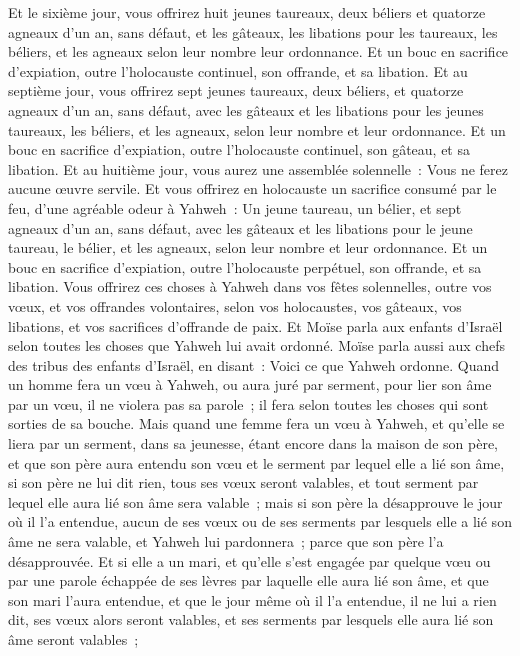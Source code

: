 \begin{multicols}{2}
Et le sixième jour, vous offrirez huit jeunes taureaux, deux béliers et quatorze agneaux d'un an, sans défaut,
et les gâteaux, les libations pour les taureaux, les béliers, et les agneaux selon leur nombre leur ordonnance.
Et un bouc en sacrifice d'expiation, outre l'holocauste continuel, son offrande, et sa libation.
Et au septième jour, vous offrirez sept jeunes taureaux, deux béliers, et quatorze agneaux d'un an, sans défaut,
avec les gâteaux et les libations pour les jeunes taureaux, les béliers, et les agneaux, selon leur nombre et leur ordonnance.
Et un bouc en sacrifice d'expiation, outre l'holocauste continuel, son gâteau, et sa libation.
Et au huitième jour, vous aurez une assemblée solennelle~: Vous ne ferez aucune œuvre servile.
Et vous offrirez en holocauste un sacrifice consumé par le feu, d'une agréable odeur à Yahweh~: Un jeune taureau, un bélier, et sept agneaux d'un an, sans défaut,
avec les gâteaux et les libations pour le jeune taureau, le bélier, et les agneaux, selon leur nombre et leur ordonnance.
Et un bouc en sacrifice d'expiation, outre l'holocauste perpétuel, son offrande, et sa libation.
Vous offrirez ces choses à Yahweh dans vos fêtes solennelles, outre vos vœux, et vos offrandes volontaires, selon vos holocaustes, vos gâteaux, vos libations, et vos sacrifices d'offrande de paix.
\VerseOne{}Et Moïse parla aux enfants d'Israël selon toutes les choses que Yahweh lui avait ordonné.
Moïse parla aussi aux chefs des tribus des enfants d'Israël, en disant~: Voici ce que Yahweh ordonne.
Quand un homme fera un vœu à Yahweh, ou aura juré par serment, pour lier son âme par un vœu, il ne violera pas sa parole~; il fera selon toutes les choses qui sont sorties de sa bouche.
Mais quand une femme fera un vœu à Yahweh, et qu'elle se liera par un serment, dans sa jeunesse, étant encore dans la maison de son père,
et que son père aura entendu son vœu et le serment par lequel elle a lié son âme, si son père ne lui dit rien, tous ses vœux seront valables, et tout serment par lequel elle aura lié son âme sera valable~;
mais si son père la désapprouve le jour où il l'a entendue, aucun de ses vœux ou de ses serments par lesquels elle a lié son âme ne sera valable, et Yahweh lui pardonnera~; parce que son père l'a désapprouvée.
Et si elle a un mari, et qu'elle s'est engagée par quelque vœu ou par une parole échappée de ses lèvres par laquelle elle aura lié son âme,
et que son mari l'aura entendue, et que le jour même où il l'a entendue, il ne lui a rien dit, ses vœux alors seront valables, et ses serments par lesquels elle aura lié son âme seront valables~;

\end{multicols}
